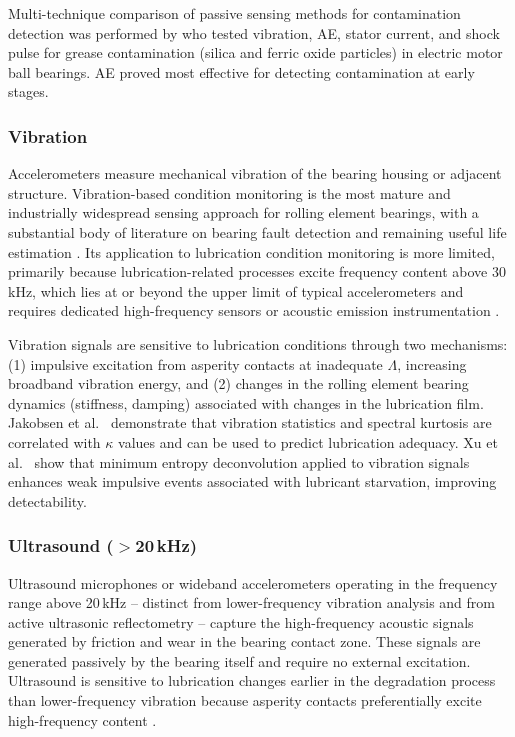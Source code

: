 Multi-technique comparison of passive sensing methods for contamination detection was performed by  who tested vibration, AE, stator current, and shock pulse for grease contamination (silica and ferric oxide particles) in electric motor ball bearings. AE proved most effective for detecting contamination at early stages.

\subsubsection{Vibration}
\label{subsubsec:vibration}
Accelerometers measure mechanical vibration of the bearing housing or adjacent structure. Vibration-based condition monitoring is the most mature and industrially widespread sensing approach for rolling element bearings, with a substantial body of literature on bearing fault detection and remaining useful life estimation \cite{randall_vibrationbased_2021,rai_review_2016}. Its application to lubrication condition monitoring is more limited, primarily because lubrication-related processes excite frequency content above 30\,kHz, which lies at or beyond the upper limit of typical accelerometers and requires dedicated high-frequency sensors or acoustic emission instrumentation \cite{jakobsen_detecting_2023}.

Vibration signals are sensitive to lubrication conditions through two mechanisms: (1) impulsive excitation from asperity contacts at inadequate $\Lambda$, increasing broadband vibration energy, and (2) changes in the rolling element bearing dynamics (stiffness, damping) associated with changes in the lubrication film. Jakobsen et al.\ \cite{jakobsen_vibration_2021} demonstrate that vibration statistics and spectral kurtosis are correlated with $\kappa$ values and can be used to predict lubrication adequacy. Xu et al.\ \cite{xu_vibration-based_2024} show that minimum entropy deconvolution applied to vibration signals enhances weak impulsive events associated with lubricant starvation, improving detectability.

\subsubsection{Ultrasound ($>$20\,kHz)}
\label{subsubsec:ultrasound_passive}
Ultrasound microphones or wideband accelerometers operating in the frequency range above 20\,kHz -- distinct from lower-frequency vibration analysis and from active ultrasonic reflectometry -- capture the high-frequency acoustic signals generated by friction and wear in the bearing contact zone. These signals are generated passively by the bearing itself and require no external excitation. Ultrasound is sensitive to lubrication changes earlier in the degradation process than lower-frequency vibration because asperity contacts preferentially excite high-frequency content \cite{jakobsen_detecting_2023,jakobsen_low_2024}.

